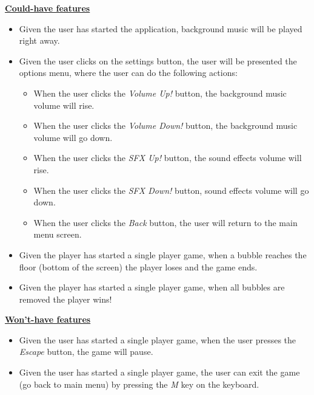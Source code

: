 \documentclass[a4paper,11pt]{article}
\begin{document}
\textbf{\underline{Could-have features}}
\begin{itemize}
  \item Given the user has started the application, background music will be played right away.
  \item Given the user clicks on the settings button, the user will be presented the options menu, where the user can do the following actions:
    \begin{itemize}
    \item When the user clicks the \textit{Volume Up!} button, the background music volume will rise.
    \item When the user clicks the \textit{Volume Down!} button, the background music volume will go down.
    \item When the user clicks the \textit{SFX Up!} button, the sound effects volume will rise.
    \item When the user clicks the \textit{SFX Down!} button, sound effects volume will go down.
    \item When the user clicks the \textit{Back} button, the user will return to the main menu screen.
    \end{itemize}
   \item Given the player has started a single player game, when a bubble reaches the floor (bottom of the screen) the player loses and the game ends.
   \item Given the player has started a single player game, when all bubbles are removed the player wins! \\
\end{itemize}

\textbf{\underline{Won't-have features}}
\begin{itemize}
   \item Given the user has started a single player game, when the user presses the \textit{Escape} button, the game will pause.
   \item Given the user has started a single player game, the user can exit the game (go back to main menu) by pressing the \textit{M} key on the keyboard.
\end{itemize}

\newpage
\end{document}
